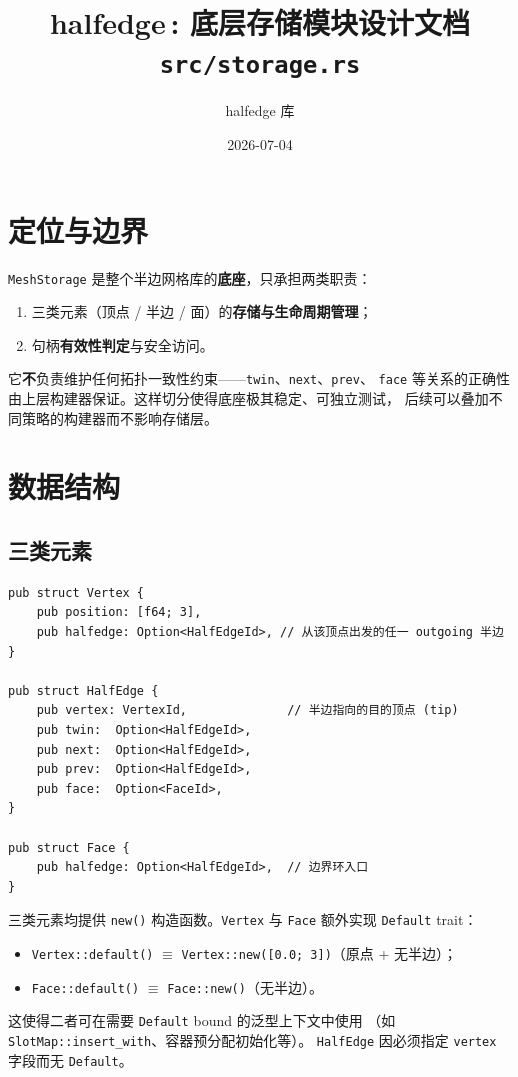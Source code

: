 \documentclass[11pt,a4paper]{article}
\title{\textbf{halfedge\,: 底层存储模块设计文档} \\ \large \texttt{src/storage.rs}}
\author{halfedge 库}
\date{2026-07-04}
\begin{document}
\maketitle
\tableofcontents

\section{定位与边界}

\texttt{MeshStorage} 是整个半边网格库的\textbf{底座}，只承担两类职责：
\begin{enumerate}
  \item 三类元素（顶点 / 半边 / 面）的\textbf{存储与生命周期管理}；
  \item 句柄\textbf{有效性判定}与安全访问。
\end{enumerate}

它\textbf{不}负责维护任何拓扑一致性约束——\texttt{twin}、\texttt{next}、\texttt{prev}、
\texttt{face} 等关系的正确性由上层构建器保证。这样切分使得底座极其稳定、可独立测试，
后续可以叠加不同策略的构建器而不影响存储层。

\section{数据结构}

\subsection{三类元素}

\begin{lstlisting}
pub struct Vertex {
    pub position: [f64; 3],
    pub halfedge: Option<HalfEdgeId>, // 从该顶点出发的任一 outgoing 半边
}

pub struct HalfEdge {
    pub vertex: VertexId,              // 半边指向的目的顶点 (tip)
    pub twin:  Option<HalfEdgeId>,
    pub next:  Option<HalfEdgeId>,
    pub prev:  Option<HalfEdgeId>,
    pub face:  Option<FaceId>,
}

pub struct Face {
    pub halfedge: Option<HalfEdgeId>,  // 边界环入口
}
\end{lstlisting}

三类元素均提供 \texttt{new()} 构造函数。\texttt{Vertex} 与 \texttt{Face}
额外实现 \texttt{Default} trait：
\begin{itemize}
  \item \texttt{Vertex::default()} $\equiv$ \texttt{Vertex::new([0.0; 3])}（原点 + 无半边）；
  \item \texttt{Face::default()} $\equiv$ \texttt{Face::new()}（无半边）。
\end{itemize}
这使得二者可在需要 \texttt{Default} bound 的泛型上下文中使用
（如 \texttt{SlotMap::insert\_with}、容器预分配初始化等）。
\texttt{HalfEdge} 因必须指定 \texttt{vertex} 字段而无 \texttt{Default}。
\end{document}
